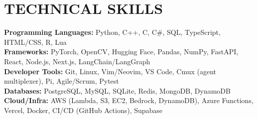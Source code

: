\documentclass[letterpaper,11pt]{article}
\begin{document}
\section{\textbf{TECHNICAL SKILLS}}
 \begin{itemize}[leftmargin=0.15in, label={}, itemsep=-3pt, topsep=0pt]
    \small{\item{
     \textbf{Programming Languages:}{ Python, C++, C, C\#, SQL, TypeScript, HTML/CSS, R, Lua} \\
     \textbf{Frameworks:}{ PyTorch, OpenCV, Hugging Face, Pandas, NumPy, FastAPI, React, Node.js, Next.js, LangChain/LangGraph} \\
     \textbf{Developer Tools:}{ Git, Linux, Vim/Neovim, VS Code, Cmux (agent multiplexer), Pi, Agile/Scrum, Pytest} \\
     \textbf{Databases:}{ PostgreSQL, MySQL, SQLite, Redis, MongoDB, DynamoDB} \\
     \textbf{Cloud/Infra:}{ AWS (Lambda, S3, EC2, Bedrock, DynamoDB), Azure Functions, Vercel, Docker, CI/CD (GitHub Actions), Supabase}
    }}
 \end{itemize}

\end{document}
